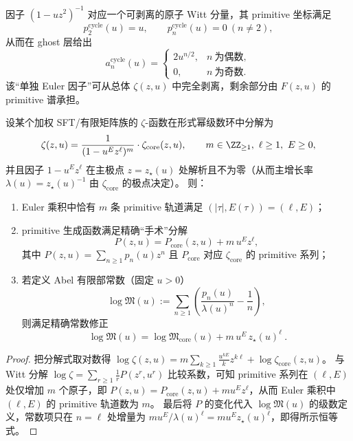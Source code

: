 \begin{remark}\label{rem:real-input-40-single-euler}
因子 $(1-uz^2)^{-1}$ 对应一个可剥离的原子 Witt 分量，其 primitive 坐标满足
\[
p^{\mathrm{cycle}}_2(u)=u,\qquad p^{\mathrm{cycle}}_n(u)=0\ (n\neq 2),
\]
从而在 ghost 层给出
\[
a^{\mathrm{cycle}}_n(u)=
\begin{cases}
2u^{n/2},& n\ \text{为偶数},\\
0,& n\ \text{为奇数}.
\end{cases}
\]
该“单独 Euler 因子”可从总体 $\zeta(z,u)$ 中完全剥离，剩余部分由 $F(z,u)$ 的 primitive 谱承担。
\end{remark}



\begin{proposition}\label{prop:primitive-orbit-surgery}
设某个加权 SFT/有限矩阵族的 \(\zeta\)-函数在形式幂级数环中分解为
\[
\zeta(z,u)=\frac{1}{(1-u^{E}z^{\ell})^{m}}\cdot \zeta_{\mathrm{core}}(z,u),
\qquad m\in\ZZ_{\ge 1},\ \ell\ge 1,\ E\ge 0,
\]
并且因子 \(1-u^{E}z^{\ell}\) 在主极点 \(z=z_\star(u)\) 处解析且不为零（从而主增长率 \(\lambda(u)=z_\star(u)^{-1}\) 由 \(\zeta_{\mathrm{core}}\) 的极点决定）。
则：
\begin{enumerate}
  \item Euler 乘积中恰有 \(m\) 条 primitive 轨道满足 \((|\tau|,E(\tau))=(\ell,E)\)；
  \item primitive 生成函数满足精确“手术”分解
  \[
  P(z,u)=P_{\mathrm{core}}(z,u)+m\,u^{E}z^{\ell},
  \]
  其中 \(P(z,u)=\sum_{n\ge 1}p_n(u)z^n\) 且 \(P_{\mathrm{core}}\) 对应 \(\zeta_{\mathrm{core}}\) 的 primitive 系列；
  \item 若定义 Abel 有限部常数（固定 \(u>0\)）
  \[
  \log\mathfrak{M}(u):=\sum_{n\ge 1}\left(\frac{p_n(u)}{\lambda(u)^n}-\frac{1}{n}\right),
  \]
  则满足精确常数修正
  \[
  \boxed{\ \log\mathfrak{M}(u)=\log\mathfrak{M}_{\mathrm{core}}(u)+m\,u^{E}\,z_\star(u)^{\ell}\ }.
  \]
\end{enumerate}
\end{proposition}
\begin{proof}
把分解式取对数得
\(
\log\zeta(z,u)=m\sum_{k\ge 1}\frac{u^{kE}}{k}z^{k\ell}+\log\zeta_{\mathrm{core}}(z,u)
\)。
与 Witt 分解 \(\log\zeta=\sum_{r\ge 1}\frac{1}{r}P(z^{r},u^{r})\) 比较系数，可知 primitive 系列在 \((\ell,E)\) 处仅增加 \(m\) 个原子，即
\(
P(z,u)=P_{\mathrm{core}}(z,u)+m u^{E}z^{\ell}
\)，从而 Euler 乘积中 \((\ell,E)\) 的 primitive 轨道数为 \(m\)。
最后将 \(P\) 的变化代入 \(\log\mathfrak{M}(u)\) 的级数定义，常数项只在 \(n=\ell\) 处增量为 \(m u^{E}/\lambda(u)^{\ell}=m u^{E}z_\star(u)^{\ell}\)，即得所示恒等式。
\end{proof}

